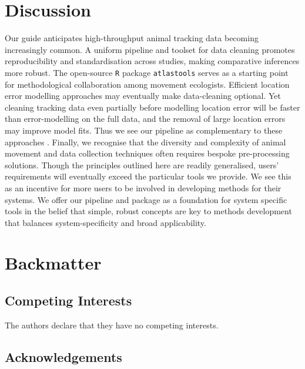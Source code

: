 \documentclass[10pt,paper=a4,headings=standardclasses
]{scrartcl}
\begin{document}
\section{Discussion}

Our guide anticipates high-throughput animal tracking data becoming increasingly common.
A uniform pipeline and toolset for data cleaning promotes reproducibility and standardisation across studies, making comparative inferences more robust.
The open-source \texttt{R} package \texttt{atlastools} serves as a starting point for methodological collaboration among movement ecologists.
Efficient location error modelling approaches \citep{fleming2020} may eventually make data-cleaning optional.
Yet cleaning tracking data even partially before modelling location error will be faster than error-modelling on the full data, and the removal of large location errors may improve model fits.
Thus we see our pipeline as complementary to these approaches \citep{fleming2014a,fleming2020}.
Finally, we recognise that the diversity and complexity of animal movement and data collection techniques often requires bespoke pre-processing solutions.
Though the principles outlined here are readily generalised, users' requirements will eventually exceed the particular tools we provide.
We see this as an incentive for more users to be involved in developing methods for their systems.
We offer our pipeline and package as a foundation for system specific tools in the belief that simple, robust concepts are key to methods development that balances system-specificity and broad applicability.

\section{Backmatter}

\subsection{Competing Interests}

The authors declare that they have no competing interests.

\subsection{Acknowledgements}
\end{document}
